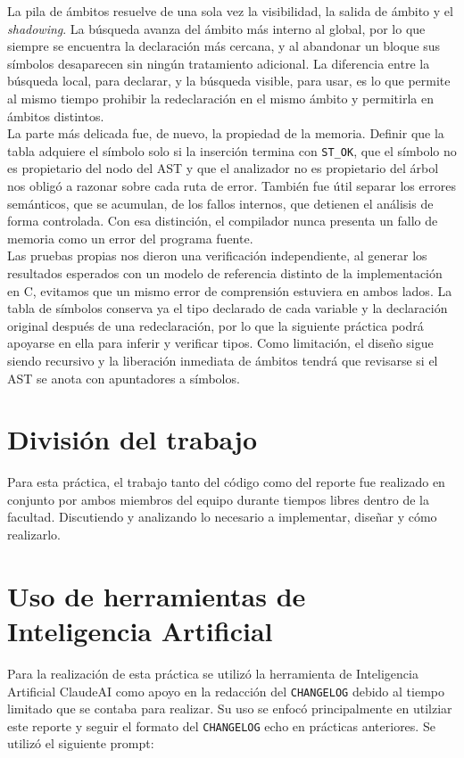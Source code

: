 \documentclass[12pt,letterpaper]{article}
\begin{document}
La pila de ámbitos resuelve de una sola vez la visibilidad, la salida de ámbito y el \emph{shadowing}. La
búsqueda avanza del ámbito más interno al global, por lo que siempre se encuentra la declaración más
cercana, y al abandonar un bloque sus símbolos desaparecen sin ningún tratamiento adicional. La diferencia
entre la búsqueda local, para declarar, y la búsqueda visible, para usar, es lo que permite al mismo tiempo
prohibir la redeclaración en el mismo ámbito y permitirla en ámbitos distintos.\\

La parte más delicada fue, de nuevo, la propiedad de la memoria. Definir que la tabla adquiere el símbolo solo
si la inserción termina con \texttt{ST\_OK}, que el símbolo no es propietario del nodo del AST y que el
analizador no es propietario del árbol nos obligó a razonar sobre cada ruta de error. También fue útil separar
los errores semánticos, que se acumulan, de los fallos internos, que detienen el análisis de forma controlada.
Con esa distinción, el compilador nunca presenta un fallo de memoria como un error del programa fuente.\\

Las pruebas propias nos dieron una verificación independiente, al generar los resultados esperados con un modelo
de referencia distinto de la implementación en C, evitamos que un mismo error de comprensión estuviera en ambos
lados. La tabla de símbolos conserva ya el tipo declarado de cada variable y la declaración original después de
una redeclaración, por lo que la siguiente práctica podrá apoyarse en ella para inferir y verificar tipos.
Como limitación, el diseño sigue siendo recursivo y la liberación inmediata de ámbitos tendrá que revisarse
si el AST se anota con apuntadores a símbolos.

\section*{División del trabajo}
Para esta práctica, el trabajo tanto del código como del reporte fue realizado en conjunto por ambos miembros
del equipo durante tiempos libres dentro de la facultad. Discutiendo y analizando lo necesario a implementar,
diseñar y cómo realizarlo.

\section*{Uso de herramientas de Inteligencia Artificial}
Para la realización de esta práctica se utilizó la herramienta de Inteligencia Artificial ClaudeAI como apoyo
en la redacción del \texttt{CHANGELOG} debido al tiempo limitado que se contaba para realizar. Su uso se enfocó
principalmente en utilziar este reporte y seguir el formato del \texttt{CHANGELOG} echo en prácticas anteriores.
Se utilizó el siguiente prompt:
\end{document}
